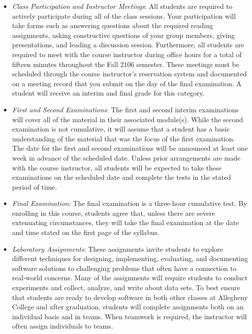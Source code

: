 \begin{itemize}

  \item {\em Class Participation and Instructor Meetings\/}: All students are required to actively participate during all
    of the class sessions. Your participation will take forms such as answering questions about the required reading
    assignments, asking constructive questions of your group members, giving presentations, and leading a discussion
    session. Furthermore, all students are required to meet with the course instructor during office hours for a total
    of fifteen minutes throughout the Fall 2106 semester. These meetings must be scheduled through the course
    instructor's reservation system and documented on a meeting record that you submit on the day of the final
    examination. A student will receive an interim and final grade for this category.

  \item {\em First and Second Examinations\/}: The first and second interim examinations will cover all of the material in
    their associated module(s).  While the second examination is not cumulative, it will assume that a student has a
    basic understanding of the material that was the focus of the first examination.  The date for the first and second
    examinations will be announced at least one week in advance of the scheduled date.  Unless prior arrangements are
    made with the course instructor, all students will be expected to take these examinations on the scheduled date and
    complete the tests in the stated period of time.

  \item {\em Final Examination\/}: The final examination is a three-hour cumulative test.  By enrolling in this course,
    students agree that, unless there are severe extenuating circumstances, they will take the final examination at the
    date and time stated on the first page of the syllabus.

  \item {\em Laboratory Assignments\/}: These assignments invite students to explore different techniques for designing,
    implementing, evaluating, and documenting software solutions to challenging problems that often have a connection to
    real-world concerns.  Many of the assignments will require students to conduct experiments and collect, analyze, and
    write about data sets.  To best ensure that students are ready to develop software in both other classes at
    Allegheny College and after graduation, students will complete assignments both on an individual basis and in teams.
    When teamwork is required, the instructor will often assign individuals to teams.


\end{itemize}
